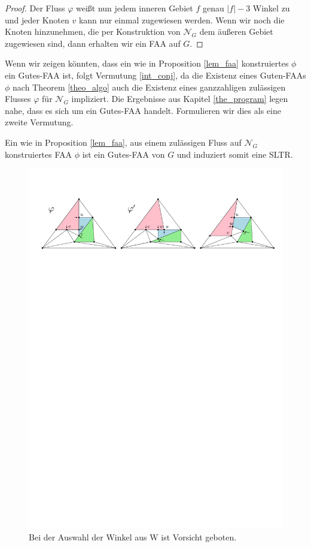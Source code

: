 \begin{proof}
Der Fluss $\varphi$ weißt nun jedem inneren Gebiet $f$ genau $|f|-3$ Winkel zu und jeder Knoten $v$ kann nur einmal zugewiesen werden. Wenn wir noch die Knoten hinzunehmen, die per Konstruktion von $\mathcal{N}_G$ dem äußeren Gebiet zugewiesen sind, dann erhalten wir ein FAA auf $G$.
\end{proof}

Wenn wir zeigen könnten, dass ein wie in Proposition \ref{lem_faa} konstruiertes $\phi$ ein Gutes-FAA ist, folgt Vermutung \ref{int_conj}, da die Existenz eines Guten-FAAs $\phi$ nach Theorem \ref{theo_algo} auch die Existenz eines ganzzahligen zulässigen Flusses $\varphi$ für $\mathcal{N}_G$ impliziert. Die Ergebnisse aus Kapitel \ref{the_program} legen nahe, dass es sich um ein Gutes-FAA handelt. Formulieren wir dies als eine zweite Vermutung.

\begin{conjecture}\label{faa_conj}
Ein wie in Proposition \ref{lem_faa}, aus einem zulässigen Fluss auf $\mathcal{N}_G$ konstruiertes FAA $\phi$ ist ein Gutes-FAA von $G$ und induziert somit eine SLTR.
\end{conjecture}

\begin{figure}[b]
\centering
\includegraphics[width=1\textwidth]{lem_faa_choice_ex.pdf}
\caption{Bei der Auswahl der Winkel aus W ist Vorsicht geboten.}
\label{lem_faa_choice_ex}
\end{figure}



